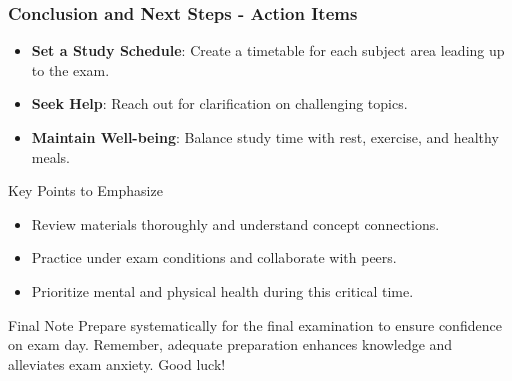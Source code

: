 \documentclass[aspectratio=169]{beamer}
\begin{document}
\begin{frame}[fragile]
    \frametitle{Conclusion and Next Steps - Action Items}
    \begin{itemize}
        \item \textbf{Set a Study Schedule}: Create a timetable for each subject area leading up to the exam.
        \item \textbf{Seek Help}: Reach out for clarification on challenging topics.
        \item \textbf{Maintain Well-being}: Balance study time with rest, exercise, and healthy meals.
    \end{itemize}

    \begin{block}{Key Points to Emphasize}
        \begin{itemize}
            \item Review materials thoroughly and understand concept connections.
            \item Practice under exam conditions and collaborate with peers.
            \item Prioritize mental and physical health during this critical time.
        \end{itemize}
    \end{block}

    \begin{block}{Final Note}
        Prepare systematically for the final examination to ensure confidence on exam day. Remember, adequate preparation enhances knowledge and alleviates exam anxiety. Good luck!
    \end{block}
\end{frame}
\end{document}
